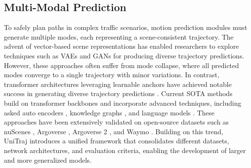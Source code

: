 
\subsection{Multi-Modal Prediction}\label{section:multi-modal-prediction}
To safely plan paths in complex traffic scenarios, motion prediction modules must generate multiple modes, each representing a scene-consistent trajectory. The advent of vector-based scene representations has enabled researchers to explore techniques such as \acp{VAE} \cite{casas2020implicit,cui2021lookout} and \acp{GAN} \cite{huang2020diversitygan} for producing diverse trajectory predictions. However, these approaches often suffer from mode collapse, where all predicted modes converge to a single trajectory with minor variations. In contrast, transformer architectures leveraging learnable anchors have achieved notable success in generating diverse trajectory predictions \cite{liu2021multimodal,ngiam2021scene,zhou2022hivt,zhou2023query}. Current SOTA methods build on transformer backbones and incorporate advanced techniques, including asked auto encoders \cite{cheng2023forecast,lan2023sept}, knowledge graphs \cite{sun2024semanticformer}, and language models \cite{seff2023motionlm}. These approaches have been extensively validated on open-source datasets such as nuScenes \cite{caesar2020nuscenes}, Argoverse \cite{chang2019argoverse}, Argoverse 2 \cite{wilson2023argoverse}, and Waymo \cite{mei2022waymo}. Building on this trend, UniTraj \cite{feng2024unitraj} introduces a unified framework that consolidates different datasets, network architectures, and evaluation criteria, enabling the development of larger and more generalized models.